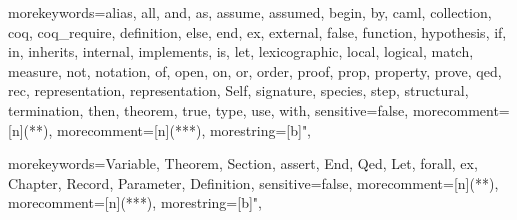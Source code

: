 \newcommand{\ocaml}{{\sf OCaml}}
\newcommand{\moca}{{\sf Moca}}
\newcommand{\focal}{{\sf FoCaL}}
\newcommand{\coq}{{\sf Coq}}
\newcommand{\Coq}{{\sf Coq}}
\newcommand{\cime}{{\sf CiME}}
\newcommand{\Cime}{{\sf CiME}}
\newcommand{\zenon}{{\sf Zenon}}
\newcommand{\Zenon}{{\sf Zenon}}
\newcommand{\Ocaml}{{\sf OCaml}}
\newcommand{\focdoc}{\textsc{focdoc}}
\newcommand{\focalize}{{\sf FoCaLize}}
\newcommand{\decldeps}[1] {\lbag\ #1\rbag}
\newcommand{\defdeps}[1]
  {\lbag\hspace{-0.2cm}\lbag\ #1\rbag\hspace{-0.2cm}\rbag}

  {morekeywords={alias, all, and, as, assume, assumed, begin, by, caml,
      collection, coq, coq_require, definition, else, end,
      ex, external, false, function, hypothesis, if, in,
      inherits, internal, implements, is, let, lexicographic,
      local, logical, match, measure, not, notation, of, open,
      on, or, order, proof, prop, property, prove, qed, rec,
      representation, representation, Self, signature, species, step,
      structural, termination, then, theorem, true, type, use,
      with},
    sensitive=false,
    morecomment=[n]{(*}{*)},  %
    morecomment=[n]{(**}{*)},  %
    morestring=[b]",
  }

\newcommand{\setlangfocalize}{
\lstset{
  language=Focal, tabsize=2, frame=single, breaklines=true,
  basicstyle=\ttfamily, framexleftmargin=1mm, xleftmargin=1mm
}
}
\setlangfocalize


  {morekeywords={Variable, Theorem, Section, assert, End, Qed, Let,
      forall, ex, Chapter, Record, Parameter, Definition},
    sensitive=false,
    morecomment=[n]{(*}{*)},   %
    morecomment=[n]{(**}{*)},  %
    morestring=[b]",
  }

\newcommand{\setlangcoq}{
\lstset{
  language=Coq, tabsize=2, frame=single, breaklines=true,
  basicstyle=\ttfamily, framexleftmargin=1mm, xleftmargin=1mm
}
}
